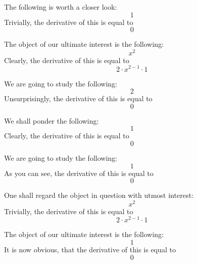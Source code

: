 \documentclass{article}
\begin{document}
The following is worth a closer look:
\begin{equation}
1 
\end{equation}
Trivially, the derivative of this is equal to
\begin{equation}
0 
\end{equation}

The object of our ultimate interest is the following:
\begin{equation}
x ^{2 } 
\end{equation}
Clearly, the derivative of this is equal to
\begin{equation}
2 \cdot x ^{2 - 1 } \cdot 1 
\end{equation}

We are going to study the following:
\begin{equation}
2 
\end{equation}
Unsurprisingly, the derivative of this is equal to
\begin{equation}
0 
\end{equation}

We shall ponder the following:
\begin{equation}
1 
\end{equation}
Clearly, the derivative of this is equal to
\begin{equation}
0 
\end{equation}

We are going to study the following:
\begin{equation}
1 
\end{equation}
As you can see, the derivative of this is equal to
\begin{equation}
0 
\end{equation}

One shall regard the object in question with utmost interest:
\begin{equation}
x ^{2 } 
\end{equation}
Trivially, the derivative of this is equal to
\begin{equation}
2 \cdot x ^{2 - 1 } \cdot 1 
\end{equation}

The object of our ultimate interest is the following:
\begin{equation}
1 
\end{equation}
It is now obvious, that the derivative of this is equal to
\begin{equation}
0 
\end{equation}
\end{document}
